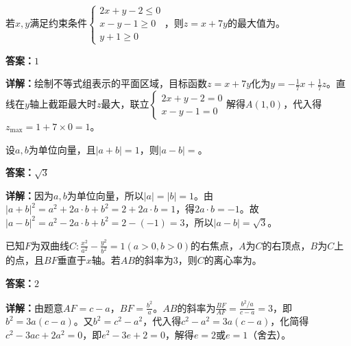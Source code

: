 \begin{question}[points=5]
若$x,y$满足约束条件$\begin{cases}2x+y-2\leq 0\\ x-y-1\geq 0\\ y+1\geq 0\end{cases}$，则$z=x+7y$的最大值为。
\fillin[{$1$}]
\begin{solution}
\textbf{答案：}$1$

\textbf{详解：}绘制不等式组表示的平面区域，目标函数$z=x+7y$化为$y=-\frac{1}{7}x+\frac{1}{7}z$。直线在$y$轴上截距最大时$z$最大，联立$\begin{cases}2x+y-2=0\\ x-y-1=0\end{cases}$解得$A(1,0)$，代入得$z_{\max}=1+7\times0=1$。
\end{solution}
\end{question}

\begin{question}[points=5]
设$a,b$为单位向量，且$|a+b|=1$，则$|a-b|=$。
\fillin[{$\sqrt{3}$}]
\begin{solution}
\textbf{答案：}$\sqrt{3}$

\textbf{详解：}因为$a,b$为单位向量，所以$|a|=|b|=1$。由$|a+b|^2=a^2+2a\cdot b+b^2=2+2a\cdot b=1$，得$2a\cdot b=-1$。故$|a-b|^2=a^2-2a\cdot b+b^2=2-(-1)=3$，所以$|a-b|=\sqrt{3}$。
\end{solution}
\end{question}

\begin{question}[points=5]
已知$F$为双曲线$C:\frac{x^2}{a^2}-\frac{y^2}{b^2}=1(a>0,b>0)$的右焦点，$A$为$C$的右顶点，$B$为$C$上的点，且$BF$垂直于$x$轴。若$AB$的斜率为$3$，则$C$的离心率为。
\fillin[{$2$}]
\begin{solution}
\textbf{答案：}$2$

\textbf{详解：}由题意$AF=c-a$，$BF=\frac{b^2}{a}$。$AB$的斜率为$\frac{BF}{AF}=\frac{b^2/a}{c-a}=3$，即$b^2=3a(c-a)$。又$b^2=c^2-a^2$，代入得$c^2-a^2=3a(c-a)$，化简得$c^2-3ac+2a^2=0$，即$e^2-3e+2=0$，解得$e=2$或$e=1$（舍去）。
\end{solution}
\end{question}

